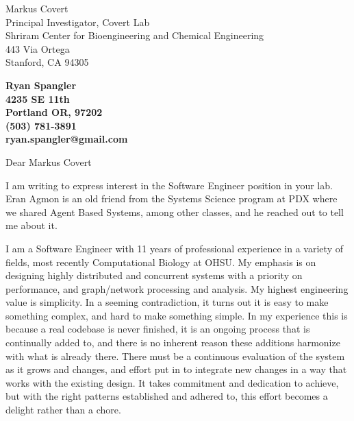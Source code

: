 \documentclass[11pt]{letter} %
\begin{document}

\begin{letter}{Markus Covert \\
Principal Investigator, Covert Lab \\
Shriram Center for Bioengineering and Chemical Engineering \\
443 Via Ortega \\
Stanford, CA 94305}


\begin{center}
\large\bf Ryan Spangler \\
4235 SE 11th \\
Portland OR, 97202 \\
(503) 781-3891 \\
ryan.spangler@gmail.com

\end{center} 
\vfill

\signature{Ryan Spangler} %


\opening{Dear Markus Covert}
 
I am writing to express interest in the Software Engineer position in your lab. Eran Agmon is an old friend from the Systems Science program at PDX where we shared Agent Based Systems, among other classes, and he reached out to tell me about it. 

I am a Software Engineer with 11 years of professional experience in a variety of fields, most recently Computational Biology at OHSU. My emphasis is on designing highly distributed and concurrent systems with a priority on performance, and graph/network processing and analysis. My highest engineering value is simplicity. In a seeming contradiction, it turns out it is easy to make something complex, and hard to make something simple. In my experience this is because a real codebase is never finished, it is an ongoing process that is continually added to, and there is no inherent reason these additions harmonize with what is already there. There must be a continuous evaluation of the system as it grows and changes, and effort put in to integrate new changes in a way that works with the existing design. It takes commitment and dedication to achieve, but with the right patterns established and adhered to, this effort becomes a delight rather than a chore.


\end{letter}
\end{document}
